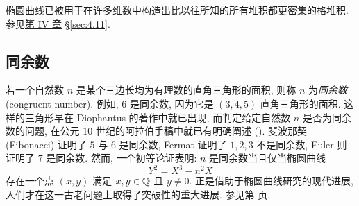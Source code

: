 \begin{center}
\end{center}

椭圆曲线已被用于在许多维数中构造出比以往所知的所有堆积都更密集的格堆积. 参见\hyperref[ch:4]{第 IV 章} \S \ref{sec:4.11}.

\subsection*{同余数}
若一个自然数 $n$ 是某个三边长均为有理数的直角三角形的面积, 则称 $n$ 为\textit{同余数} (congruent number). 例如, $6$ 是同余数, 因为它是 $(3,4,5)$ 直角三角形的面积. 这样的三角形早在 Diophantus 的著作中就已出现, 而判定给定自然数 $n$ 是否为同余数的问题, 在公元 $10$ 世纪的阿拉伯手稿中就已有明确阐述 (\cite{dickson1966}). 斐波那契 (Fibonacci) 证明了 $5$ 与 $6$ 是同余数, Fermat 证明了 $1, 2, 3$ 不是同余数, Euler 则证明了 $7$ 是同余数. 然而, 一个初等论证表明: $n$ 是同余数当且仅当椭圆曲线
\[
Y^2 = X^3 - n^2 X
\]
存在一个点 $(x,y)$ 满足 $x,y \in \mathbb{Q}$ 且 $y \neq 0$. 正是借助于椭圆曲线研究的现代进展, 人们才在这一古老问题上取得了突破性的重大进展. 参见第 \pageref{subsec:congruent} 页.


